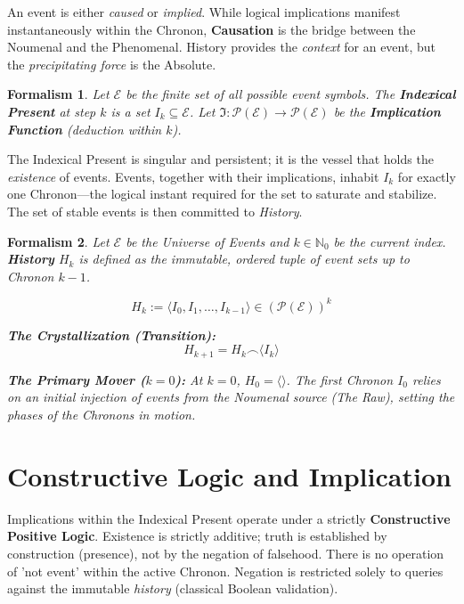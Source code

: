 \documentclass[12pt, a4paper]{article}
\newtheorem{formalism}{Formalism}
\begin{document}
An event is either \textit{caused} or \textit{implied}. While logical implications manifest instantaneously within the Chronon, \textbf{Causation} is the bridge between the Noumenal and the Phenomenal. History provides the \textit{context} for an event, but the \textit{precipitating force} is the Absolute.

\begin{formalism}
Let $\mathcal{E}$ be the finite set of all possible event symbols.
The \textbf{Indexical Present} at step $k$ is a set $I_k \subseteq \mathcal{E}$.
Let $\mathfrak{I}: \mathcal{P}(\mathcal{E}) \to \mathcal{P}(\mathcal{E})$ be the \textbf{Implication Function} (deduction within $k$).
\end{formalism}

The Indexical Present is singular and persistent; it is the vessel that holds the \textit{existence} of events. Events, together with their implications, inhabit $I_k$ for exactly one Chronon—the logical instant required for the set to saturate and stabilize. The set of stable events is then committed to \textit{History}.

\begin{formalism}
Let $\mathcal{E}$ be the Universe of Events and $k \in \mathbb{N}_0$ be the current index.
\textbf{History} $H_k$ is defined as the immutable, ordered tuple of event sets up to Chronon $k-1$.

$$H_k := \langle I_0, I_1, \dots, I_{k-1} \rangle \in (\mathcal{P}(\mathcal{E}))^{k}$$

\textbf{The Crystallization (Transition):}
$$H_{k+1} = H_k \frown \langle I_{k} \rangle$$

\textbf{The Primary Mover ($k=0$):}
At $k=0$, $H_0 = \langle \rangle$. The first Chronon $I_0$ relies on an initial injection of events from the Noumenal source (The Raw), setting the phases of the Chronons in motion.
\end{formalism}

\section{Constructive Logic and Implication}

Implications within the Indexical Present operate under a strictly \textbf{Constructive Positive Logic}. Existence is strictly additive; truth is established by construction (presence), not by the negation of falsehood. There is no operation of 'not event' within the active Chronon. Negation is restricted solely to queries against the immutable \textit{history} (classical Boolean validation).
\end{document}
